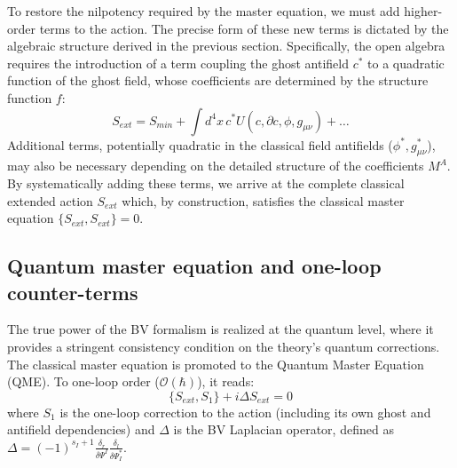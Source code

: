 \documentclass[twocolumn]{aastex631}
\begin{document}
To restore the nilpotency required by the master equation, we must add higher-order terms to the action. The precise form of these new terms is dictated by the algebraic structure derived in the previous section. Specifically, the open algebra requires the introduction of a term coupling the ghost antifield $c^*$ to a quadratic function of the ghost field, whose coefficients are determined by the structure function $f$:
\begin{equation}
S_{ext} = S_{min} + \int d^4x \, c^* U(c, \partial c, \phi, g_{\mu\nu}) + \dots
\end{equation}
Additional terms, potentially quadratic in the classical field antifields ($\phi^*, g_{\mu\nu}^*$), may also be necessary depending on the detailed structure of the coefficients $M^A$. By systematically adding these terms, we arrive at the complete classical extended action $S_{ext}$ which, by construction, satisfies the classical master equation $\{S_{ext}, S_{ext}\} = 0$.

\subsection{Quantum master equation and one-loop counter-terms}
The true power of the BV formalism is realized at the quantum level, where it provides a stringent consistency condition on the theory's quantum corrections. The classical master equation is promoted to the Quantum Master Equation (QME). To one-loop order ($\mathcal{O}(\hbar)$), it reads:
\begin{equation}
\{S_{ext}, S_1\} + i \Delta S_{ext} = 0
\end{equation}
where $S_1$ is the one-loop correction to the action (including its own ghost and antifield dependencies) and $\Delta$ is the BV Laplacian operator, defined as $\Delta = (-1)^{s_I+1} \frac{\delta_r}{\delta \Psi^I} \frac{\delta_l}{\delta \Psi^*_I}$.
\end{document}
